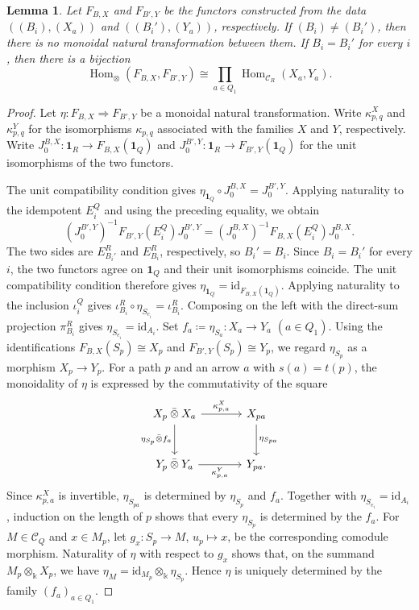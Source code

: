 \documentclass{amsart}
\newcommand{\id}{\mathrm{id}}
\newcommand{\btensor}{\mathbin{\bar{\otimes}}}
\newtheorem{lemma}[theorem]{Lemma}
\theoremstyle{definition}
\theoremstyle{remark}
\numberwithin{equation}{section}
\begin{document}
\begin{lemma}\label{xxlem4.4}
Let
$F_{B,X}$
and
$F_{B',Y}$
be the functors constructed from the data
$((B_i),(X_a))$
and
$((B_i'),(Y_a))$,
respectively.
If $(B_i)\neq(B_i')$,
then there is no monoidal natural transformation between them.
If $B_i=B_i'$ for every $i$,
then there is a bijection
\[
\operatorname{Hom}_\otimes(F_{B,X},F_{B',Y})
\cong
\prod_{a\in Q_1}
\operatorname{Hom}_{\mathcal C_R}(X_a,Y_a).
\]

\end{lemma}

\begin{proof}
Let $\eta\colon F_{B,X}\Rightarrow F_{B',Y}$
be a monoidal natural transformation.
Write $\kappa^X_{p,q}$ and $\kappa^Y_{p,q}$ for the isomorphisms
$\kappa_{p,q}$ associated with the families $X$ and $Y$, respectively.
Write
$J_0^{B,X}\colon\mathbf1_R\to F_{B,X}(\mathbf1_Q)$ and
$J_0^{B',Y}\colon\mathbf1_R\to F_{B',Y}(\mathbf1_Q)$
for the unit isomorphisms of the two functors.

The unit compatibility condition gives
$\eta_{\mathbf1_Q}\circ J_0^{B,X}=J_0^{B',Y}$.
Applying naturality to the idempotent $E_i^Q$ and using the preceding
equality, we obtain
\[
(J_0^{B',Y})^{-1}
F_{B',Y}(E_i^Q)
J_0^{B',Y}
=
(J_0^{B,X})^{-1}
F_{B,X}(E_i^Q)
J_0^{B,X}.
\]
The two sides are $E_{B_i'}^R$ and $E_{B_i}^R$, respectively, so
$B_i'=B_i$.
Since $B_i=B_i'$ for every $i$, the two functors agree on
$\mathbf1_Q$ and their unit isomorphisms coincide.
The unit compatibility condition therefore gives
$\eta_{\mathbf1_Q}=\id_{F_{B,X}(\mathbf1_Q)}$.
Applying naturality to the inclusion $\iota_i^Q$ gives
$\iota_{B_i}^R\circ\eta_{S_{e_i}}=\iota_{B_i}^R$.
Composing on the left with the direct-sum projection $\pi_{B_i}^R$ gives
$\eta_{S_{e_i}}=\id_{A_i}$.
Set $f_a\coloneqq\eta_{S_a}\colon X_a\to Y_a$ $(a\in Q_1)$.
Using the identifications
$F_{B,X}(S_p)\cong X_p$ and
$F_{B',Y}(S_p)\cong Y_p$,
we regard $\eta_{S_p}$ as a morphism $X_p\to Y_p$.
For a path $p$ and an arrow $a$ with $s(a)=t(p)$, the monoidality of
$\eta$ is expressed by the commutativity of the square
\[
\begin{tikzcd}[column sep=large,row sep=large]
X_p\btensor X_a
  \arrow[r,"\kappa^X_{p,a}"]
  \arrow[d,"\eta_{S_p}\btensor f_a"']
&
X_{pa}
  \arrow[d,"\eta_{S_{pa}}"]\\
Y_p\btensor Y_a
  \arrow[r,"\kappa^Y_{p,a}"']
&
Y_{pa}.
\end{tikzcd}
\]
Since $\kappa^X_{p,a}$ is invertible, $\eta_{S_{pa}}$ is determined by
$\eta_{S_p}$ and $f_a$. Together with $\eta_{S_{e_i}}=\id_{A_i}$,
induction on the length of $p$ shows that every $\eta_{S_p}$ is
determined by the $f_a$.
For $M\in\mathcal C_Q$ and $x\in M_p$, let
$g_x\colon S_p\to M$, $u_p\mapsto x$,
be the corresponding comodule morphism.
Naturality of $\eta$ with respect to $g_x$ shows that,
on the summand $M_p\otimes_{\Bbbk} X_p$, we have
$\eta_M=\id_{M_p}\otimes_{\Bbbk}\eta_{S_p}$.
Hence $\eta$ is uniquely determined by the family
$(f_a)_{a\in Q_1}$.


\end{proof}
\end{document}
